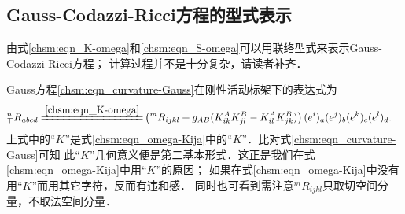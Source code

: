 

\subsection{Gauss-Codazzi-Ricci方程的型式表示}
由式\eqref{chsm:eqn_K-omega}和\eqref{chsm:eqn_S-omega}可以用联络型式来表示Gauss-Codazzi-Ricci方程；
计算过程并不是十分复杂，请读者补齐．

Gauss方程\eqref{chsm:eqn_curvature-Gauss}在刚性活动标架下的表达式为
\setlength{\mathindent}{0em}
\begin{equation}\label{chsm:eqn_curvature-Gauss-Frame}
    \begin{aligned}
        {}^{n}_{\top}{R}_{abcd} %
        \xlongequal{\ref{chsm:eqn_K-omega}}& \left({}^{m}{R}_{ijkl} +{g}_{AB} (K^A_{ik}K^B_{jl}
        - K^A_{il} K^B_{jk} ) \right)(e^i)_a (e^j)_b (e^k)_c (e^l)_d .
    \end{aligned}
\end{equation}\setlength{\mathindent}{2em}
上式中的“$K$”是式\eqref{chsm:eqn_omega-Kija}中的“$K$”．比对式\eqref{chsm:eqn_curvature-Gauss}可知
此“$K$”几何意义便是第二基本形式．这正是我们在式\eqref{chsm:eqn_omega-Kija}中用“$K$”的原因；
如果在式\eqref{chsm:eqn_omega-Kija}中没有用“$K$”而用其它字符，反而有违和感．
同时也可看到需注意${}^{m}{R}_{ijkl}$只取切空间分量，不取法空间分量．

